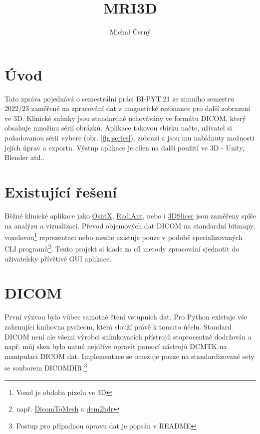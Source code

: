 \documentclass[czech]{pyt-report}
\title{MRI3D}
\author{Michal Černý}
\affiliation{FIT ČVUT}
\begin{document}
\maketitle

\section{Úvod}
\label{sec:uvod}
Tato zpráva pojednává o semestrální práci BI-PYT.21 ze zimního semestru 2022/23 zaměřené na zpracování dat z magnetické rezonance pro další zobrazení ve 3D. Klinické snímky jsou standardně uchovávány ve formátu DICOM, který obsahuje množinu sérií obrázků. Aplikace takovou sbírku načte, uživatel si požadovanou sérii vybere (obr. \ref{fig:series}), zobrazí a jsou mu nabídnuty možnosti jejích úprav a exportu. Výstup aplikace je cílen na další použití ve 3D - Unity, Blender atd..

\section{Existující řešení}
\label{sec:exitujici_reseni}
Běžné klinické aplikace jako \href{https://www.osirix-viewer.com/}{OsiriX}, \href{https://www.radiantviewer.com/}{RadiAnt}, nebo i \href{https://www.slicer.org/}{3DSlicer} jsou zaměřeny spíše na analýzu a vizualizaci. Převod objemových dat DICOM na standardní bitmapy, voxelovou\footnote{Voxel je obdoba pixelu ve 3D} reprezentaci nebo meshe existuje pouze v podobě specializovaných CLI programů\footnote{např. \href{https://github.com/AOT-AG/DicomToMesh}{DicomToMesh} a \href{https://github.com/dvolgyes/dcm2hdr}{dcm2hdr}}. Tento projekt si klade za cíl metody zpracování sjednotit do uživatelsky přívětivé GUI aplikace.

\section{DICOM}
\label{sec:dicom}
První výzvou bylo vůbec samotné čtení vstupních dat. Pro Python existuje vše zahrnující knihovna pydicom\cite{bib:pydicom}, která slouží právě k tomuto účelu. Standard DICOM\cite{bib:dicom-structures}\cite{bib:dicom-dictionary} není ale všemi výrobci snímkovacích přístrojů stoprocentně dodržován a např. můj sken bylo nutné nejdříve opravit pomocí nástrojů DCMTK na manipulaci DICOM dat. Implementace se omezuje pouze na standardizované sety se souborem DICOMDIR.\footnote{Postup pro případnou opravu dat je popsán v README}
\end{document}
